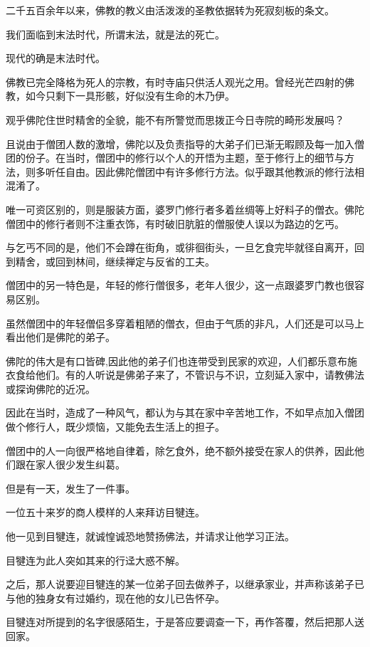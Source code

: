 \documentclass[twoside,openany]{book}
\begin{document}
二千五百余年以来，佛教的教义由活泼泼的圣教依据转为死寂刻板的条文。

我们面临到末法时代，所谓末法，就是法的死亡。

现代的确是末法时代。

佛教已完全降格为死人的宗教，有时寺庙只供活人观光之用。曾经光芒四射的佛教，如今只剩下一具形骸，好似没有生命的木乃伊。

观乎佛陀住世时精舍的全貌，能不有所警觉而思拨正今日寺院的畸形发展吗？

且说由于僧团人数的激增，佛陀以及负责指导的大弟子们已渐无暇顾及每一加入僧团的份子。在当时，僧团中的修行以个人的开悟为主题，至于修行上的细节与方法，则多听任自由。因此佛陀僧团中有许多修行方法。似乎跟其他教派的修行法相混淆了。

唯一可资区别的，则是服装方面，婆罗门修行者多着丝绸等上好料子的僧衣。佛陀僧团中的修行者则不注重衣饰，有时破旧肮脏的僧服使人误以为路边的乞丐。

与乞丐不同的是，他们不会蹲在街角，或徘徊街头，一旦乞食完毕就径自离开，回到精舍，或回到林间，继续禅定与反省的工夫。

僧团中的另一特色是，年轻的修行僧很多，老年人很少，这一点跟婆罗门教也很容易区别。

虽然僧团中的年轻僧侣多穿着粗陋的僧衣，但由于气质的非凡，人们还是可以马上看出他们是佛陀的弟子。

佛陀的伟大是有口皆碑,因此他的弟子们也连带受到民家的欢迎，人们都乐意布施衣食给他们。有的人听说是佛弟子来了，不管识与不识，立刻延入家中，请教佛法或探询佛陀的近况。

因此在当时，造成了一种风气，都认为与其在家中辛苦地工作，不如早点加入僧团做个修行人，既少烦恼，又能免去生活上的担子。

僧团中的人一向很严格地自律着，除乞食外，绝不额外接受在家人的供养，因此他们跟在家人很少发生纠葛。

但是有一天，发生了一件事。

一位五十来岁的商人模样的人来拜访目犍连。







他一见到目犍连，就诚惶诚恐地赞扬佛法，并请求让他学习正法。

目犍连为此人突如其来的行迳大惑不解。

之后，那人说要迎目犍连的某一位弟子回去做养子，以继承家业，并声称该弟子已与他的独身女有过婚约，现在他的女儿已告怀孕。

目犍连对所提到的名字很感陌生，于是答应要调查一下，再作答覆，然后把那人送回家。
\end{document}
